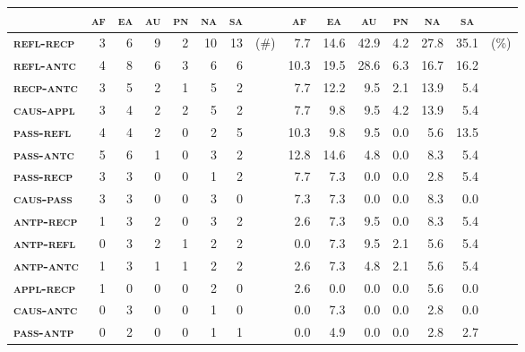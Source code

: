 \begin{table}[b]
	\setlength{\tabcolsep}{3.2pt}
	\begin{tabularx}{\textwidth}{lrrrrrrlrrrrrrl}
		\lsptoprule
		& \multicolumn{1}{c}{\textbf{\textsc{af}}} & \multicolumn{1}{c}{\textbf{\textsc{ea}}} & \multicolumn{1}{c}{\textbf{\textsc{au}}} & \multicolumn{1}{c}{\textbf{\textsc{pn}}} & \multicolumn{1}{c}{\textbf{\textsc{na}}} & \multicolumn{1}{c}{\textbf{\textsc{sa}}} & & \multicolumn{1}{c}{\textbf{\textsc{af}}} & \multicolumn{1}{c}{\textbf{\textsc{ea}}} & \multicolumn{1}{c}{\textbf{\textsc{au}}} & \multicolumn{1}{c}{\textbf{\textsc{pn}}} & \multicolumn{1}{c}{\textbf{\textsc{na}}} & \multicolumn{1}{c}{\textbf{\textsc{sa}}} & \\
		\midrule
		\textbf{\textsc{refl-recp}} & 3 & 6 & 9 & 2 & 10 & 13 & (\#) & 7.7 & 14.6 & 42.9 & 4.2 & 27.8 & 35.1 & (\%) \\
		\textbf{\textsc{refl-antc}} & 4 & 8 & 6 & 3 & 6 & 6 & & 10.3 & 19.5 & 28.6 & 6.3 & 16.7 & 16.2 & \\
		\textbf{\textsc{recp-antc}} & 3 & 5 & 2 & 1 & 5 & 2 & & 7.7 & 12.2 & 9.5 & 2.1 & 13.9 & 5.4 & \\
		\textbf{\textsc{caus-appl}} & 3 & 4 & 2 & 2 & 5 & 2 & & 7.7 & 9.8 & 9.5 & 4.2 & 13.9 & 5.4 & \\
		\textbf{\textsc{pass-refl}} & 4 & 4 & 2 & 0 & 2 & 5 & & 10.3 & 9.8 & 9.5 & 0.0 & 5.6 & 13.5 & \\
		\textbf{\textsc{pass-antc}} & 5 & 6 & 1 & 0 & 3 & 2 & & 12.8 & 14.6 & 4.8 & 0.0 & 8.3 & 5.4 & \\
		\textbf{\textsc{pass-recp}} & 3 & 3 & 0 & 0 & 1 & 2 & & 7.7 & 7.3 & 0.0 & 0.0 & 2.8 & 5.4 & \\
		\textbf{\textsc{caus-pass}} & 3 & 3 & 0 & 0 & 3 & 0 & & 7.3 & 7.3 & 0.0 & 0.0 & 8.3 & 0.0 & \\
		\textbf{\textsc{antp-recp}} & 1 & 3 & 2 & 0 & 3 & 2 & & 2.6 & 7.3 & 9.5 & 0.0 & 8.3 & 5.4 & \\
		\textbf{\textsc{antp-refl}} & 0 & 3 & 2 & 1 & 2 & 2 & & 0.0 & 7.3 & 9.5 & 2.1 & 5.6 & 5.4 & \\
		\textbf{\textsc{antp-antc}} & 1 & 3 & 1 & 1 & 2 & 2 & & 2.6 & 7.3 & 4.8 & 2.1 & 5.6 & 5.4 & \\
		\textbf{\textsc{appl-recp}} & 1 & 0 & 0 & 0 & 2 & 0 & & 2.6 & 0.0 & 0.0 & 0.0 & 5.6 & 0.0 & \\
		\textbf{\textsc{caus-antc}} & 0 & 3 & 0 & 0 & 1 & 0 & & 0.0 & 7.3 & 0.0 & 0.0 & 2.8 & 0.0 & \\
		\textbf{\textsc{pass-antp}} & 0 & 2 & 0 & 0 & 1 & 1 & & 0.0 & 4.9 & 0.0 & 0.0 & 2.8 & 2.7 & \\

\end{tabularx}
\end{table}
